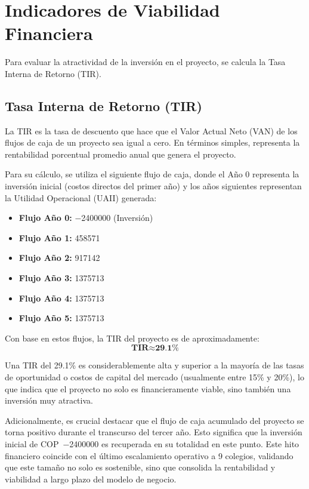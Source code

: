\section{Indicadores de Viabilidad Financiera}

Para evaluar la atractividad de la inversión en el proyecto, se calcula la 
Tasa Interna de Retorno (TIR).

\subsection{Tasa Interna de Retorno (TIR)}

La TIR es la tasa de descuento que hace que el Valor Actual Neto (VAN) de los 
flujos de caja de un proyecto sea igual a cero. En términos simples, 
representa la rentabilidad porcentual promedio anual que genera el proyecto.

Para su cálculo, se utiliza el siguiente flujo de caja, donde el Año 0 
representa la inversión inicial (costos directos del primer año) y los años 
siguientes representan la Utilidad Operacional (UAII) generada:

\begin{itemize}
    \item \textbf{Flujo Año 0:} \num{-2400000} (Inversión)
    \item \textbf{Flujo Año 1:} \num{458571}
    \item \textbf{Flujo Año 2:} \num{917142}
    \item \textbf{Flujo Año 3:} \num{1375713}
    \item \textbf{Flujo Año 4:} \num{1375713}
    \item \textbf{Flujo Año 5:} \num{1375713}
\end{itemize}

Con base en estos flujos, la TIR del proyecto es de aproximadamente:
\[ \textbf{TIR} \approx \textbf{29.1\%} \]

Una TIR del 29.1\% es considerablemente alta y superior a la mayoría de las 
tasas de oportunidad o costos de capital del mercado (usualmente entre 15\% y 
20\%), lo que indica que el proyecto no solo es financieramente viable, sino 
también una inversión muy atractiva.

Adicionalmente, es crucial destacar que el flujo de caja acumulado del
proyecto se torna positivo durante el transcurso del tercer año. Esto
significa que la inversión inicial de \mbox{COP \num{-2400000}} es recuperada
en su totalidad en este punto. Este hito financiero coincide con el último
escalamiento operativo a 9 colegios, validando que este tamaño no solo es
sostenible, sino que consolida la rentabilidad y viabilidad a largo plazo
del modelo de negocio.
